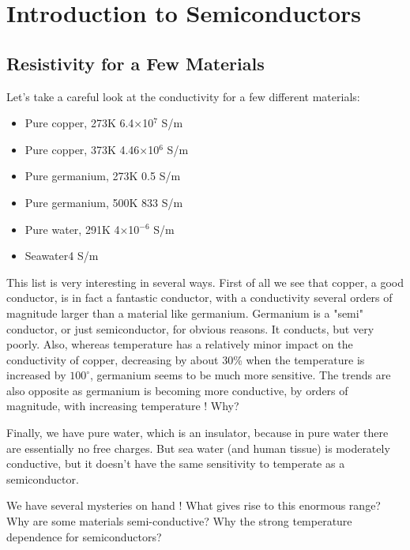 \section{ Introduction to Semiconductors}




\subsection{Resistivity for a Few Materials}


Let's take a careful look at the conductivity for a few different materials:
\vspace{.5cm}


\begin{minipage}[c]{.65\textwidth}
\begin{itemize}
\item  Pure copper, 273K \hfill 6.4×10$^{7}$ S/m
\item Pure copper, 373K \hfill 4.46×10$^{6}$ S/m
\item Pure germanium, 273K \hfill 0.5  S/m
\item Pure germanium, 500K \hfill 833 S/m
\item Pure water, 291K \hfill 4×10$^{-6}$ S/m
\item Seawater\hfill 4 S/m
\end{itemize} 
\end{minipage}
\vspace{.5cm}


This list is very interesting in several ways.  First of all we see that copper, a good conductor, is in fact a fantastic conductor, with a conductivity several orders of magnitude larger than a material like germanium.  Germanium is a "semi" conductor, or just semiconductor, for obvious reasons.  It conducts, but very poorly.  Also, whereas temperature has a relatively minor impact on the conductivity of copper, decreasing by about 30\% when the temperature is increased by $100^\circ$, germanium seems to be much more sensitive.  The trends are also opposite as germanium is becoming more conductive, by orders of magnitude, with increasing temperature !  Why?


Finally, we have pure water, which is an insulator, because in pure water there are essentially no free charges.  But sea water (and human tissue) is moderately conductive, but it doesn't have the same sensitivity to temperate as a semiconductor.


We have several mysteries on hand !
What gives rise to this enormous range?
Why are some materials semi-conductive?
Why the strong temperature dependence for semiconductors?
